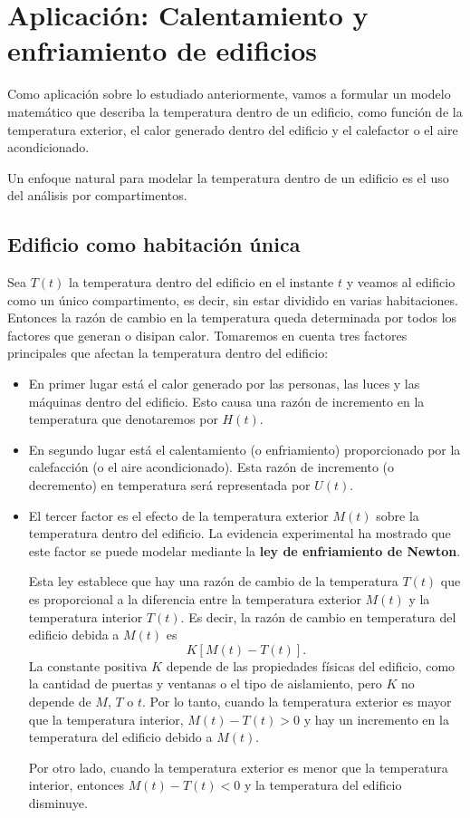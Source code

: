 \chapter{Aplicación: Calentamiento y enfriamiento de edificios}
Como aplicación sobre lo estudiado anteriormente, vamos a formular un modelo matemático que describa la temperatura dentro de un edificio, como función de la temperatura exterior, el calor generado dentro del edificio y el calefactor o el aire acondicionado.

Un enfoque natural para modelar la temperatura dentro de un edificio es el uso del análisis por compartimentos.
\section{Edificio como habitación única}
Sea $T(t)$ la temperatura dentro del edificio en el instante $t$ y veamos al edificio como un único compartimento, es decir, sin estar dividido en varias habitaciones. Entonces la razón de cambio en la temperatura queda determinada por todos los factores que generan o disipan calor. Tomaremos en cuenta tres factores principales que afectan la temperatura dentro del edificio:
\begin{itemize}
	\item En primer lugar está el calor generado por las personas, las luces y las máquinas dentro del edificio. Esto causa una razón de incremento en la temperatura que denotaremos por $H(t)$.
	\item En segundo lugar está el calentamiento (o enfriamiento) proporcionado por la calefacción (o el aire acondicionado).  Esta razón de incremento (o decremento) en temperatura será representada por $U(t)$.
	\item El tercer factor es el efecto de la temperatura exterior $M(t)$ sobre la temperatura dentro del edificio. La evidencia experimental ha mostrado que este factor se puede modelar mediante la \textbf{ley de enfriamiento de Newton}.
	
	Esta ley establece que hay una razón de cambio de la temperatura $T(t)$ que es proporcional a la diferencia entre la temperatura exterior $M(t)$ y la temperatura interior $T(t)$. Es decir, la razón de cambio en temperatura del edificio debida a $M(t)$ es 
	\begin{equation}
		K[M(t) - T(t)].
	\end{equation}
	La constante positiva $K$ depende de las propiedades físicas del edificio, como la cantidad de puertas y ventanas o el tipo de aislamiento, pero $K$ no depende de $M$, $T$ o $t$. Por lo tanto, cuando la temperatura exterior es mayor que la temperatura interior, $M(t) - T(t) > 0$ y hay un incremento en la temperatura del edificio debido a $M(t)$. 
	
	Por otro lado, cuando la temperatura exterior es menor que la temperatura interior, entonces $M(t) - T(t) < 0$ y la temperatura del edificio disminuye.
\end{itemize}
